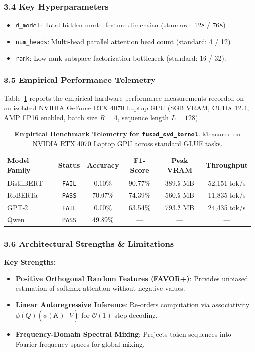 \subsubsection*{3.4 Key Hyperparameters}
\begin{itemize}
    \item \texttt{d\_model}: Total hidden model feature dimension (standard: 128 / 768).
    \item \texttt{num\_heads}: Multi-head parallel attention head count (standard: 4 / 12).
    \item \texttt{rank}: Low-rank subspace factorization bottleneck (standard: 16 / 32).
\end{itemize}

\subsubsection*{3.5 Empirical Performance Telemetry}
Table~\ref{tab:telemetry_fused_svd_kernel} reports the empirical hardware performance measurements recorded on an isolated NVIDIA GeForce RTX 4070 Laptop GPU (8GB VRAM, CUDA 12.4, AMP FP16 enabled, batch size $B=4$, sequence length $L=128$).

\begin{table}[h]
\centering
\small
\caption{\textbf{Empirical Benchmark Telemetry for \texttt{fused\_svd\_kernel}}. Measured on NVIDIA RTX 4070 Laptop GPU across standard GLUE tasks.}
\label{tab:telemetry_fused_svd_kernel}
\begin{tabular*}{\columnwidth}{@{\extracolsep{\fill}}lccccc}
\toprule
\textbf{Model Family} & \textbf{Status} & \textbf{Accuracy} & \textbf{F1-Score} & \textbf{Peak VRAM} & \textbf{Throughput} \\
\midrule
DistilBERT & \texttt{FAIL} & 0.00\% & 90.77\% & 389.5 MB & 52,151 tok/s \\
RoBERTa & \texttt{PASS} & 70.07\% & 74.39\% & 560.5 MB & 11,835 tok/s \\
GPT-2 & \texttt{FAIL} & 0.00\% & 63.54\% & 793.2 MB & 24,435 tok/s \\
Qwen & \texttt{PASS} & 49.89\% & --- & --- & --- \\
\bottomrule
\end{tabular*}
\end{table}

\subsubsection*{3.6 Architectural Strengths \& Limitations}
\textbf{Key Strengths:}
\begin{itemize}
    \item \textbf{Positive Orthogonal Random Features (FAVOR+)}: Provides unbiased estimation of softmax attention without negative values.
    \item \textbf{Linear Autoregressive Inference}: Re-orders computation via associativity $\phi(Q) (\phi(K)^\top V)$ for $\mathcal{O}(1)$ step decoding.
    \item \textbf{Frequency-Domain Spectral Mixing}: Projects token sequences into Fourier frequency spaces for global mixing.
\end{itemize}

